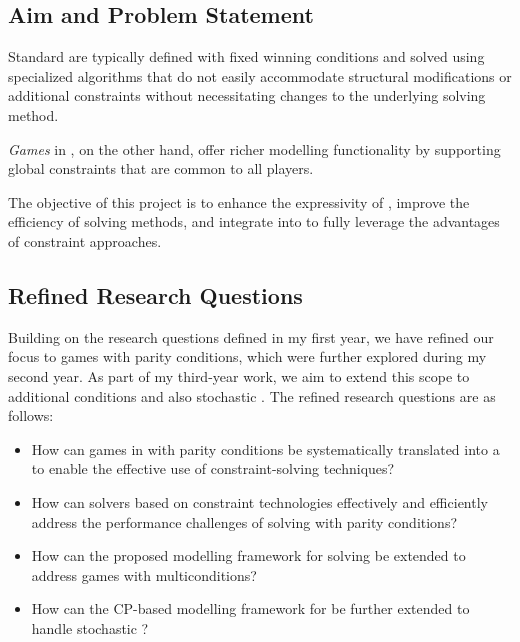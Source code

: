 \documentclass{article}
\begin{document}
\subsection{Aim and Problem Statement}

Standard \wregulargames are typically defined with fixed winning conditions and solved using specialized algorithms that do not easily accommodate structural modifications or additional constraints without necessitating changes to the underlying solving method.

\textit{Games} in \constraintform, on the other hand, offer richer modelling functionality by supporting global constraints that are common to all players.

The objective of this project is to enhance the expressivity of \wregulargames, improve the efficiency of solving methods, and integrate \wregulargames into \constraintgames to fully leverage the advantages of constraint approaches.

\subsection{Refined Research Questions}\label{sec:rq}

Building on the research questions defined in my first year, we have refined our focus to games with parity conditions, which were further explored during my second year. As part of my third-year work, we aim to extend this scope to additional conditions and also stochastic \wregulargames. The refined research questions are as follows:

\begin{itemize}[left=1.2cm]
    \item[\textbf{RQ1}] How can games in \wregularform with parity conditions be systematically translated into a \constraintform to enable the effective use of constraint-solving techniques?

    \item[\textbf{RQ2}] How can solvers based on constraint technologies effectively and efficiently address the performance challenges of solving \wregulargames with parity conditions?

    \item[\textbf{RQ3}] How can the proposed modelling framework for solving \wregulargames be extended to address games with multiconditions?

    \item[\textbf{RQ4}] How can the CP-based modelling framework for \wregulargames be further extended to handle stochastic \wregulargames?
\end{itemize}
\end{document}
